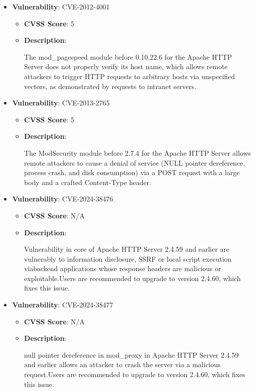 \documentclass{article}
\begin{document}
\begin{itemize}
        \item \textbf{Vulnerability}: CVE-2012-4001
        \begin{itemize}
            \item \textbf{CVSS Score}:  5 
            \item \textbf{Description}:
            \parbox[t]{0.9\linewidth}{
                \ttfamily The mod\_pagespeed module before 0.10.22.6 for the Apache HTTP Server does not properly verify its host name, which allows remote attackers to trigger HTTP requests to arbitrary hosts via unspecified vectors, as demonstrated by requests to intranet servers.
            }
        \end{itemize}
    
        \item \textbf{Vulnerability}: CVE-2013-2765
        \begin{itemize}
            \item \textbf{CVSS Score}:  5 
            \item \textbf{Description}:
            \parbox[t]{0.9\linewidth}{
                \ttfamily The ModSecurity module before 2.7.4 for the Apache HTTP Server allows remote attackers to cause a denial of service (NULL pointer dereference, process crash, and disk consumption) via a POST request with a large body and a crafted Content-Type header.
            }
        \end{itemize}
    
        \item \textbf{Vulnerability}: CVE-2024-38476
        \begin{itemize}
            \item \textbf{CVSS Score}:  N/A 
            \item \textbf{Description}:
            \parbox[t]{0.9\linewidth}{
                \ttfamily Vulnerability in core of Apache HTTP Server 2.4.59 and earlier are vulnerably to information disclosure, SSRF or local script execution viabackend applications whose response headers are malicious or exploitable.Users are recommended to upgrade to version 2.4.60, which fixes this issue.
            }
        \end{itemize}
    
        \item \textbf{Vulnerability}: CVE-2024-38477
        \begin{itemize}
            \item \textbf{CVSS Score}:  N/A 
            \item \textbf{Description}:
            \parbox[t]{0.9\linewidth}{
                \ttfamily null pointer dereference in mod\_proxy in Apache HTTP Server 2.4.59 and earlier allows an attacker to crash the server via a malicious request.Users are recommended to upgrade to version 2.4.60, which fixes this issue.
            }
        \end{itemize}
    

\end{itemize}
\end{document}
